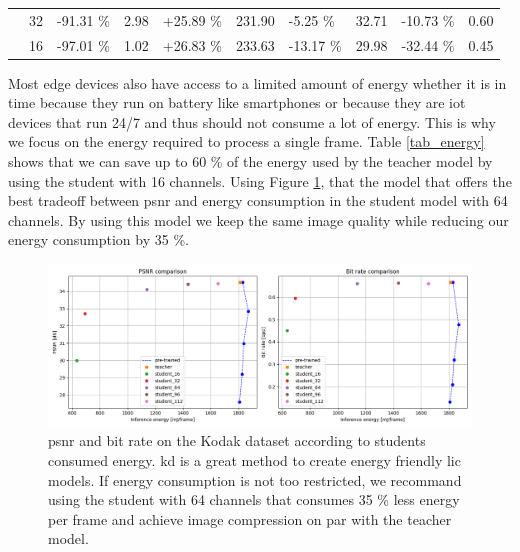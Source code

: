 \begin{table}[]
\begin{tabular}{|c|c|lr|lr|lr|lr|}
                             & 32                                                           & {\color[HTML]{656565} -91.31 \%}                       & 2.98                                              & {\color[HTML]{656565} +25.89 \%}            & 231.90 & {\color[HTML]{656565} -5.25 \%}  & 32.71 & {\color[HTML]{656565} -10.73 \%} & 0.60 \\ \cline{2-10}
                             & 16                                                           & {\color[HTML]{656565} -97.01 \%}                       & 1.02                                              & {\color[HTML]{656565} +26.83 \%}            & 233.63 & {\color[HTML]{656565} -13.17 \%} & 29.98 & {\color[HTML]{656565} -32.44 \%} & 0.45 \\ \hline
    \end{tabular}
\end{table}

Most edge devices also have access to a limited amount of energy whether it is in time because they run on battery like smartphones or because they are \acrfull{iot} devices that run 24/7 and thus should not consume a lot of energy. This is why we focus on the energy required to process a single frame. Table \ref{tab_energy} shows that we can save up to 60 \% of the energy used by the teacher model by using the student with 16 channels. Using Figure \ref{kd_lic_energy}, that the model that offers the best tradeoff between \acrshort{psnr} and energy consumption in the student model with 64 channels. By using this model we keep the same image quality while reducing our energy consumption by 35 \%.

\begin{figure}
    \centering
    \includegraphics[width=15cm]{../img/kd_lic_energy.png}
    \caption[\acrshort{psnr} and bit rate on the Kodak dataset according to students consumed energy.]{\acrshort{psnr} and bit rate on the Kodak dataset according to students consumed energy. \acrshort{kd} is a great method to create energy friendly \acrshort{lic} models. If energy consumption is not too restricted, we recommand using the student with 64 channels that consumes 35 \% less energy per frame and achieve image compression on par with the teacher model.}
    \label{kd_lic_energy}
\end{figure}

